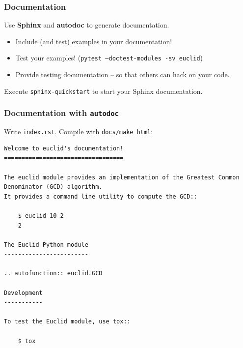 \documentclass{beamer} %
\newcommand\emc[1]{\textcolor{midred}{\textbf{#1}}}
\begin{document}
\begin{frame}

\frametitle{Documentation}

Use \emc{Sphinx} and \emc{autodoc} to generate documentation. 
\begin{itemize}
  \item Include (and test) examples in your documentation!
  \item Test your examples! (\texttt{pytest --doctest-modules -sv euclid})
  \item Provide testing documentation -- so that others can hack on your code.
\end{itemize}

\vspace{3mm}
Execute \texttt{sphinx-quickstart} to start your Sphinx documentation.
\end{frame}


\begin{frame}[fragile]

\frametitle{Documentation with \texttt{autodoc}}

Write \texttt{index.rst}. Compile with \texttt{docs/make html}:
\begin{tiny}
\begin{verbatim}
Welcome to euclid's documentation!
==================================

The euclid module provides an implementation of the Greatest Common Denominator (GCD) algorithm. 
It provides a command line utility to compute the GCD::

    $ euclid 10 2
    2

The Euclid Python module
------------------------

.. autofunction:: euclid.GCD

Development
-----------

To test the Euclid module, use tox::

    $ tox

\end{verbatim}
\end{tiny}

\end{frame}
\end{document}
